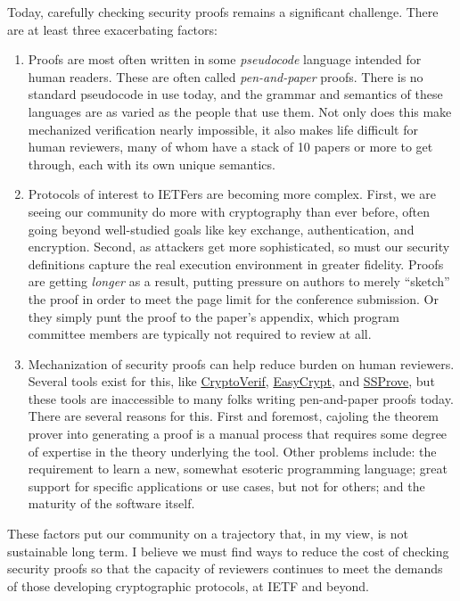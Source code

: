 \documentclass{article}
\begin{document}
Today, carefully checking security proofs remains a significant challenge.
There are at least three exacerbating factors:
%
\begin{enumerate}

  \item Proofs are most often written in some \emph{pseudocode} language
    intended for human readers. These are often called \emph{pen-and-paper}
    proofs.
    There is no standard pseudocode in use today, and the grammar and
    semantics of these languages are as varied as the people that use them.
    Not only does this make mechanized verification nearly impossible, it also
    makes life difficult for human reviewers, many of whom have a stack of
    10 papers or more to get through, each with its own unique semantics.

  \item Protocols of interest to IETFers are becoming more complex.
    First, we are seeing our community do more with cryptography than ever
    before, often going beyond well-studied goals like key exchange,
    authentication, and encryption.
    Second, as attackers get more sophisticated, so must our security definitions
    capture the real execution environment in greater fidelity.
    Proofs are getting \emph{longer} as a result, putting pressure on authors
    to merely ``sketch'' the proof in order to meet the page limit for the
    conference submission. Or they simply punt the proof to the paper's
    appendix, which program committee members are typically not required to
    review at all.

  \item Mechanization of security proofs can help reduce burden on human
    reviewers.
    Several tools exist for this, like
    \href{https://bblanche.gitlabpages.inria.fr/CryptoVerif/}{CryptoVerif},
    \href{https://github.com/EasyCrypt/easycrypt}{EasyCrypt}, and
    \href{https://github.com/SSProve/ssprove}{SSProve}, but these tools
    are inaccessible to many folks writing pen-and-paper proofs today.
    There are several reasons for this.
    First and foremost, cajoling the theorem prover into generating a proof is
    a manual process that requires some degree of expertise in the theory
    underlying the tool.
    Other problems include: the requirement to learn a new, somewhat esoteric
    programming language; great support for specific applications or use cases,
    but not for others; and the maturity of the software itself.

\end{enumerate}
%
These factors put our community on a trajectory that, in my view, is not
sustainable long term.
%
I believe we must find ways to reduce the cost of checking security proofs so
that the capacity of reviewers continues to meet the demands of those
developing cryptographic protocols, at IETF and beyond.
\end{document}
